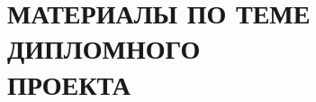 \section[Материалы по теме дипломного проекта]{%
  МАТЕРИАЛЫ ПО ТЕМЕ ДИПЛОМНОГО \\ ПРОЕКТА
}\label{sec:materials}

\pagebreak